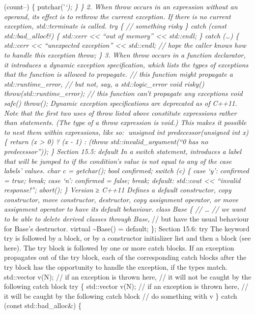 (count--) \{ putchar('\emph{`); \} \} 2. When throw occurs in an
expression without an operand, its eﬀect is to rethrow the current
exception. If there is no current exception, std::terminate is called.
try \{ // something risky \} catch (const std::bad\_alloc\&) \{
std::cerr \textless\textless{} ``out of memory'' \textless\textless{}
std::endl; \} catch (\ldots) \{ std::cerr \textless\textless{}
``unexpected exception'' \textless\textless{} std::endl; // hope the
caller knows how to handle this exception throw; \} 3. When throw occurs
in a function declarator, it introduces a dynamic exception
speciﬁcation, which lists the types of exceptions that the function is
allowed to propagate. // this function might propagate a
std::runtime\_error, // but not, say, a std::logic\_error void risky()
throw(std::runtime\_error); // this function can't propagate any
exceptions void safe() throw(); Dynamic exception speciﬁcations are
deprecated as of C++11. Note that the ﬁrst two uses of throw listed
above constitute expressions rather than statements. (The type of a
throw expression is void.) This makes it possible to nest them within
expressions, like so: unsigned int predecessor(unsigned int x) \{
return (x \textgreater{} 0) ? (x - 1) : (throw
std::invalid\_argument(``0 has no predecessor'')); \} Section 15.5:
default In a switch statement, introduces a label that will be jumped to
if the condition's value is not equal to any of the case labels' values.
char c = getchar(); bool confirmed; switch (c) \{ case `y': confirmed =
true; break; case `n': confirmed = false; break; default: std::cout
\textless\textless{} ``invalid response!\n''; abort(); \} Version ≥
C++11 Deﬁnes a default constructor, copy constructor, move constructor,
destructor, copy assignment operator, or move assignment operator to
have its default behaviour. class Base \{ // \ldots{} // we want to be
able to delete derived classes through Base}, // but have the usual
behaviour for Base's destructor. virtual \textasciitilde Base() =
default; \}; Section 15.6: try The keyword try is followed by a block,
or by a constructor initializer list and then a block (see here). The
try block is followed by one or more catch blocks. If an exception
propagates out of the try block, each of the corresponding catch blocks
after the try block has the opportunity to handle the exception, if the
types match. std::vector v(N); // if an exception is thrown here, // it
will not be caught by the following catch block try \{ std::vector v(N);
// if an exception is thrown here, // it will be caught by the following
catch block // do something with v \} catch (const std::bad\_alloc\&) \{

